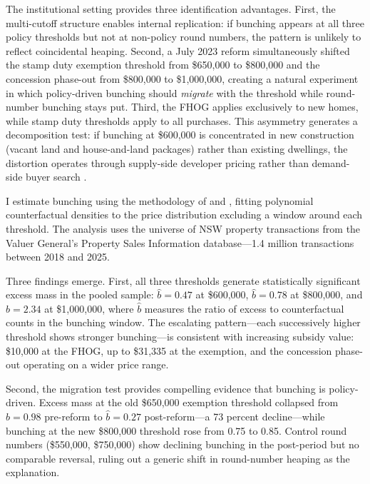 \documentclass[12pt]{article}
\begin{document}
The institutional setting provides three identification advantages. First, the multi-cutoff structure enables internal replication: if bunching appears at all three policy thresholds but not at non-policy round numbers, the pattern is unlikely to reflect coincidental heaping. Second, a July 2023 reform simultaneously shifted the stamp duty exemption threshold from \$650,000 to \$800,000 and the concession phase-out from \$800,000 to \$1,000,000, creating a natural experiment in which policy-driven bunching should \textit{migrate} with the threshold while round-number bunching stays put. Third, the FHOG applies exclusively to new homes, while stamp duty thresholds apply to all purchases. This asymmetry generates a decomposition test: if bunching at \$600,000 is concentrated in new construction (vacant land and house-and-land packages) rather than existing dwellings, the distortion operates through supply-side developer pricing rather than demand-side buyer search \citep{best2018housing}.

I estimate bunching using the methodology of \citet{chetty2011adjustment} and \citet{kleven2013using}, fitting polynomial counterfactual densities to the price distribution excluding a window around each threshold. The analysis uses the universe of NSW property transactions from the Valuer General's Property Sales Information database---1.4 million transactions between 2018 and 2025.

Three findings emerge. First, all three thresholds generate statistically significant excess mass in the pooled sample: $\hat{b} = 0.47$ at \$600,000, $\hat{b} = 0.78$ at \$800,000, and $\hat{b} = 2.34$ at \$1,000,000, where $\hat{b}$ measures the ratio of excess to counterfactual counts in the bunching window. The escalating pattern---each successively higher threshold shows stronger bunching---is consistent with increasing subsidy value: \$10,000 at the FHOG, up to \$31,335 at the exemption, and the concession phase-out operating on a wider price range.

Second, the migration test provides compelling evidence that bunching is policy-driven. Excess mass at the old \$650,000 exemption threshold collapsed from $\hat{b} = 0.98$ pre-reform to $\hat{b} = 0.27$ post-reform---a 73 percent decline---while bunching at the new \$800,000 threshold rose from 0.75 to 0.85. Control round numbers (\$550,000, \$750,000) show declining bunching in the post-period but no comparable reversal, ruling out a generic shift in round-number heaping as the explanation.
\end{document}

